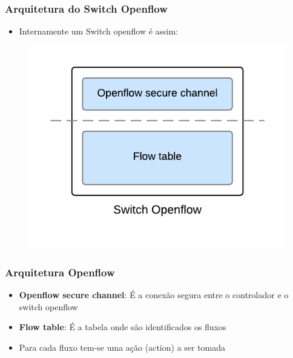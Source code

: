 %
%
\begin{frame}\frametitle{Arquitetura do Switch Openflow}

    \begin{itemize}
    \item Internamente um Switch openflow é assim:
    \end{itemize}
    
	\begin{figure}[h]
        \centering
        \includegraphics[scale=0.5]{images/openflow-switch-architecture.png}
    \end{figure}
\end{frame}

%
%
\begin{frame}\frametitle{Arquitetura Openflow}

    \begin{itemize}
    \item \textbf{Openflow secure channel}: É a conexão segura entre o
          controlador e o switch openflow
    \vspace*{0.5cm}
    \item \textbf{Flow table}: É a tabela onde são identificados os fluxos
    \vspace*{0.5cm}
    \item Para cada fluxo tem-se uma ação (action) a ser tomada
    \end{itemize}
\end{frame}

